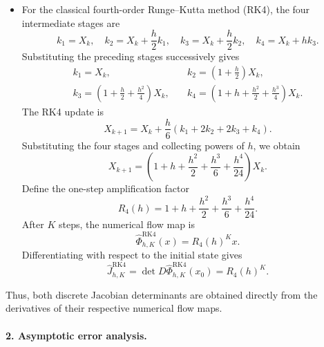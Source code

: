 \documentclass[12pt,a4paper,oneside]{book}
\begin{document}
\begin{solution}
\begin{itemize}
    \item For the classical fourth-order Runge--Kutta method (RK4), the four intermediate stages are
        \begin{equation*}
            k_1=X_k,\quad
            k_2=X_k+\frac h2k_1,\quad
            k_3=X_k+\frac h2k_2,\quad
            k_4=X_k+hk_3.
        \end{equation*}
        Substituting the preceding stages successively gives
        \begin{equation*}
            \begin{aligned}
                k_1 =X_k, &\quad k_2 =\left(1+\frac h2\right)X_k,\\
                k_3 =\left(1+\frac h2+\frac{h^2}{4}\right)X_k, &\quad
                k_4 =\left(1+h+\frac{h^2}{2}+\frac{h^3}{4}\right)X_k.
            \end{aligned}
        \end{equation*}
        The RK4 update is
        \begin{equation*}
            X_{k+1} = X_k+\frac h6(k_1+2k_2+2k_3+k_4).
        \end{equation*}
        Substituting the four stages and collecting powers of $h$, we obtain
        \begin{equation*}
            X_{k+1} = \left(
                1+h+\frac{h^2}{2} + \frac{h^3}{6}+\frac{h^4}{24}
            \right)X_k.
        \end{equation*}
        Define the one-step amplification factor
        \begin{equation*}
            R_4(h) = 1+h+\frac{h^2}{2} + \frac{h^3}{6}+\frac{h^4}{24}.
        \end{equation*}
        After $K$ steps, the numerical flow map is
        \begin{equation*}
            \widehat\Phi_{h,K}^{\mathrm{RK4}}(x) = R_4(h)^Kx.
        \end{equation*}
        Differentiating with respect to the initial state gives
        \begin{equation*}
            \widehat J_{h,K}^{\mathrm{RK4}} = \det D\widehat\Phi_{h,K}^{\mathrm{RK4}}(x_0) = R_4(h)^K.
        \end{equation*}
\end{itemize}
Thus, both discrete Jacobian determinants are obtained directly from the derivatives of their respective numerical flow
maps.

\paragraph{2. Asymptotic error analysis.}


\end{solution}
\end{document}

